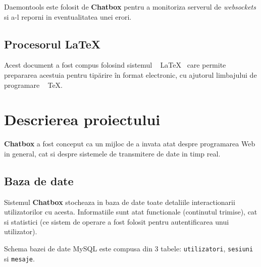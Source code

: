 \documentclass[12pt,a4paper]{article}
\begin{document}
Daemontools este folosit de \textbf{Chatbox} pentru a monitoriza serverul 
de \textit{websockets} si a-l reporni in eventualitatea unei erori.

\subsection{Procesorul \LaTeX}
Acest document a fost compus folosind sistemul ~ \LaTeX ~ care permite prepararea
acestuia pentru tipărire în format electronic,
cu ajutorul limbajului de programare ~ \TeX.



\newpage
\section{Descrierea proiectului}
\textbf{Chatbox} a fost conceput ca un mijloc de a invata atat despre programarea
Web in general, cat si despre sistemele de transmitere de date in timp real.

\subsection{Baza de date}
Sistemul \textbf{Chatbox} stocheaza in baza de date toate detaliile interactionarii
utilizatorilor cu acesta. Informatiile sunt atat functionale 
(continutul trimise), cat si statistici (ce sistem de operare a fost folosit pentru
autentificarea unui utilizator).

Schema bazei de date MySQL este compusa din 3 tabele: 
\texttt{utilizatori}, \texttt{sesiuni} si \texttt{mesaje}.
\end{document}
